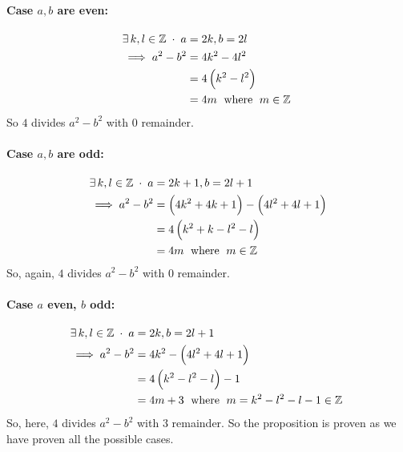 \documentclass[../MathsNotesBase.tex]{subfiles}
\begin{document}
{		\paragraph{Case $a, b$ are even:}
		\begin{align*}
		\exists\,k,l \in \mathbb{Z}^{\;} \cdot \;a &= 2k, b = 2l \\
		\implies a^2 - b^2 &= 4k^2 - 4l^2 \\
		&= 4\left(k^2 - l^2\right) \\
		&= 4m\; \text{ where } \;m \in \mathbb{Z}^{\;}  \\
		\end{align*}
		So $4$ divides $a^2 - b^2$ with $0$ remainder.
		\paragraph{Case $a, b$ are odd:}
		\begin{align*}
		\exists\,k,l \in \mathbb{Z}^{\;} \cdot \;a &= 2k+1, b = 2l+1 \\
		\implies a^2 - b^2 &= \left(4k^2 + 4k + 1\right) - \left(4l^2 + 4l + 1\right) \\
		&= 4\left(k^2 + k - l^2 - l\right) \\
		&= 4m\; \text{ where } \;m \in \mathbb{Z}^{\;}  \\
		\end{align*}
		So, again, $4$ divides $a^2 - b^2$ with $0$ remainder.
		\paragraph{Case $a$ even, $b$ odd:}
		\begin{align*}
		\exists\,k,l \in \mathbb{Z}^{\;} \cdot \;a &= 2k, b = 2l+1 \\
		\implies a^2 - b^2 &= 4k^2 - \left(4l^2 + 4l + 1\right) \\
		&= 4\left(k^2 - l^2 - l\right) - 1 \\
		&= 4m + 3\; \text{ where } \;m=k^2 - l^2 - l - 1 \in \mathbb{Z}^{\;}  \\
		\end{align*}
		So, here, $4$ divides $a^2 - b^2$ with $3$ remainder. So the proposition is proven as we have proven all the possible cases.\\
	}



\pagebreak
\end{document}

